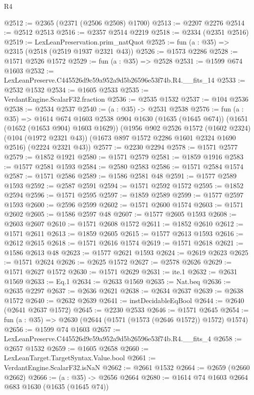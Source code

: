 \begin{lexlean}{R4}
\begin{coremodule}
@2512 := @2365 (@2371 (@2506 @2508) @1700)
@2513 := @2207 @2276
@2514 := @2512 @2513
@2516 := @2357 @2514 @2219
@2518 := @2334 (@2351 @2516)
@2519 := LexLeanPreservation.prim_natQuot
@2525 := fun (a : @35) => @2315 (@2518 (@2519 @1937 @2321 @43))
@2526 := @1573 @2286
@2528 := @1571 @2526 @1572
@2529 := fun (a : @35) => @2528
@2531 := @1599 @674 @1603
@2532 := LexLeanPreserve.C445526d9c59a952a9d5b26596e53f74b.R4.__fits_14
@2533 := @2532 @1532
@2534 := @1605 @2533
@2535 := VerdantEngine.ScalarF32.fraction
@2536 := @2535 @1532
@2537 := @104 @2536
@2538 := @2534 @2537
@2540 := (a : @35) -> @2531 @2538
@2576 := fun (a : @35) =>
  @1614
    @674
    @1603
    @2538
    @904
    @1630
    (@1635 (@1645 @674))
    (@1651 (@1652 (@1653 @904) @1603 @1629))
    (@1956
      @902
      @2526
      @1572
      (@1602 @2324)
      (@104 (@1972 @2321 @43))
      (@1673 @897 @1572 @2286 @1601 @2324 @1690 @2516)
      (@2224 @2321 @43))
@2577 := @2230 @2294
@2578 := @1571 @2577
@2579 := @1852 @1921
@2580 := @1571 @2579
@2581 := @1859 @1916
@2583 := @1577 @2581 @1593
@2584 := @2580 @2583
@2586 := @1571 @2584 @1574
@2587 := @1571 @2586
@2589 := @1586 @2581 @48
@2591 := @1577 @2589 @1593
@2592 := @2587 @2591
@2594 := @1571 @2592 @1572
@2595 := @1852 @2594
@2596 := @1571 @2595
@2597 := @1859 @2589
@2599 := @1577 @2597 @1593
@2600 := @2596 @2599
@2602 := @1571 @2600 @1574
@2603 := @1571 @2602
@2605 := @1586 @2597 @48
@2607 := @1577 @2605 @1593
@2608 := @2603 @2607
@2610 := @1571 @2608 @1572
@2611 := @1852 @2610
@2612 := @1571 @2611
@2613 := @1859 @2605
@2615 := @1577 @2613 @1593
@2616 := @2612 @2615
@2618 := @1571 @2616 @1574
@2619 := @1571 @2618
@2621 := @1586 @2613 @48
@2623 := @1577 @2621 @1593
@2624 := @2619 @2623
@2625 := @1571 @2624
@2626 := @2625 @1572
@2627 := @2578 @2626
@2629 := @1571 @2627 @1572
@2630 := @1571 @2629
@2631 := ite.{1}
@2632 := @2631 @1569
@2633 := Eq.{1}
@2634 := @2633 @1569
@2635 := Nat.beq
@2636 := @2635 @2297
@2637 := @2636 @2621
@2638 := @2634 @2637
@2639 := @2638 @1572
@2640 := @2632 @2639
@2641 := instDecidableEqBool
@2644 := @2640 (@2641 @2637 @1572)
@2645 := @2230 @2533
@2646 := @1571 @2645
@2654 := fun (a : @35) => @2630 (@2644 (@1571 (@1573 (@2646 @1572)) @1572) @1574)
@2656 := @1599 @74 @1603
@2657 := LexLeanPreserve.C445526d9c59a952a9d5b26596e53f74b.R4.__fits_4
@2658 := @2657 @1532
@2659 := @1605 @2658
@2660 := LexLeanTarget.TargetSyntax.Value.bool
@2661 := VerdantEngine.ScalarF32.isNaN
@2662 := @2661 @1532
@2664 := @2659 (@2660 @2662)
@2666 := (a : @35) -> @2656 @2664
@2680 := @1614
    @74
    @1603
    @2664
    @683
    @1630
    (@1635 (@1645 @74))

\end{coremodule}
\end{lexlean}
